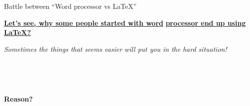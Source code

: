 \documentclass[11pt]{beamer}
\begin{document}
\begin{frame}{Battle between \textquotedblleft Word processor vs \LaTeX\textquotedblright}

\begin{center}
{\large \underline{\textbf{Let's see, why some people started with word}}}
{\large \underline{\textbf{processor end up using \LaTeX \hspace{0.2cm}?}}}
\end{center}

\pause

\vspace{0.2cm}

\begin{tcolorbox}
\begin{center}
\textit{Sometimes the things that seems easier will put you in the hard situation!}
\end{center}
\end{tcolorbox}

\vspace{0.1cm}

\pause


\begin{tcolorbox}
\begin{center}
\drWalley[5][red] 
~
\pause
{}
~
\pause
\dCooley[5][white]

\pause

{\Large{\textbf{Reason?}}}

\end{center}
\end{tcolorbox}




\end{frame}
\end{document}
